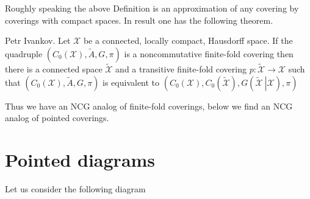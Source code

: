 \documentclass{beamer}
\theoremstyle{plain}
\newcommand{\sX}{\mathcal{X}}       %
\begin{document}
\begin{frame}
	Roughly speaking the above  Definition is an approximation of any covering by coverings with compact spaces.	
In result one has the following theorem.
\begin{theorem}
	\alert{Petr Ivankov}. 	Let $\mathcal X$ be a connected, locally compact, Hausdorff space.
	If the  quadruple $\left(C_0\left(\mathcal  X \right), \widetilde{A}, G,    \pi\right)$ is a noncommutative finite-fold covering then there is a connected space $\widetilde{   \mathcal X }$ and a transitive finite-fold covering  $p: \widetilde{   \mathcal X } \to \sX$ such that
	$\left(C_0\left(\mathcal  X \right), \widetilde{A}, G,    \pi\right)$ is equivalent to $\left(C_0\left( {   \mathcal X }\right), C_0\left( \widetilde{   \mathcal X }\right), G\left(\left. \widetilde{   \mathcal X } ~\right| {   \mathcal X }\right), \pi\right)$
\end{theorem}
Thus we have an NCG analog of finite-fold coverings, below we find an NCG analog of pointed coverings.
\end{frame}
\section{Pointed diagrams}

	Let us consider the following diagram\\
\\
\end{document}
